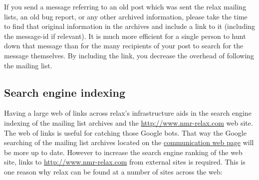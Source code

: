 If you send a message referring to an old post which was sent the relax mailing lists, an old bug report, or any other archived information, please take the time to find that original information in the archives and include a link to it (including the message-id if relevant).
It is much more efficient for a single person to hunt down that message than for the many recipients of your post to search for the message themselves.
By including the link, you decrease the overhead of following the mailing list.



\subsection{Search engine indexing}

Having a large web of links across relax's infrastructure aids in the search engine indexing of the mailing list archives and the \href{http://www.nmr-relax.com}{http://www.nmr-relax.com} web site.
The web of links is useful for catching those Google bots.
That way the Google searching of the mailing list archives located on the \href{http://www.nmr-relax.com/\-communication.html}{communication web page} will be more up to date.
However to increase the search engine ranking of the web site, links to \href{http://www.nmr-relax.com}{http://www.nmr-relax.com} from external sites is required.
This is one reason why relax can be found at a number of sites across the web:
